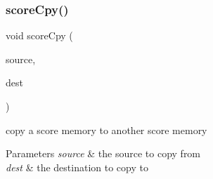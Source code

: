 \subsubsection{\texorpdfstring{score\+Cpy()}{scoreCpy()}}
{\footnotesize\ttfamily void score\+Cpy (\begin{DoxyParamCaption}\item[{sco\+Memory $\ast$}]{source,  }\item[{sco\+Memory $\ast$}]{dest }\end{DoxyParamCaption})}



copy a score memory to another score memory 


\begin{DoxyParams}{Parameters}
{\em source} & the source to copy from \\
\hline
{\em dest} & the destination to copy to \\
\hline
\end{DoxyParams}
